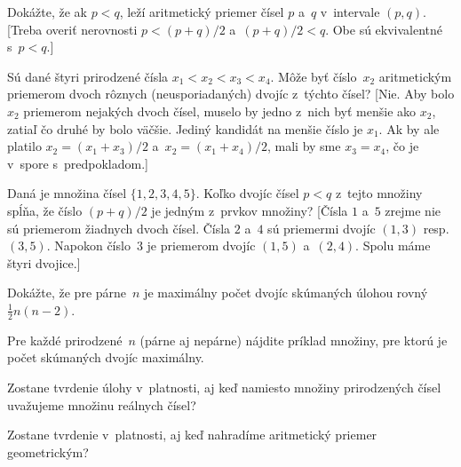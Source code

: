 {
Dokážte, že ak $p <q$, leží aritmetický priemer čísel
$p$ a~$q$ v~intervale $(p, q)$. [Treba overiť nerovnosti
$p <(p+q) / 2$ a~$(p+q) / 2 <q$. Obe sú ekvivalentné s~$p <q$.]

Sú dané štyri prirodzené čísla $x_1 <x_2 <x_3 <x_4$.
Môže byť číslo~$x_2$ aritmetickým priemerom dvoch rôznych
(neusporiadaných)
dvojíc z~týchto čísel? [Nie. Aby bolo $x_2$
priemerom nejakých dvoch čísel, muselo by jedno z~nich byť menšie ako
$x_2$, zatiaľ čo druhé by bolo väčšie. Jediný kandidát na menšie
číslo je $x_1$. Ak by ale platilo $x_2 = (x_1+x_3) / 2$
a~$x_2 = (x_1+x_4) / 2$, mali by sme $x_3 = x_4$, čo je v~spore s~predpokladom.]

Daná je množina čísel $\{1, 2, 3, 4, 5\}$. Koľko dvojíc
čísel $p <q$ z~tejto množiny spĺňa, že číslo $(p+q) / 2$ je jedným
z~prvkov množiny?
[Čísla $1$ a~$5$ zrejme nie sú priemerom
žiadnych dvoch čísel. Čísla $2$ a~$4$ sú priemermi dvojíc $(1, 3)$
resp. $(3, 5)$. Napokon číslo~$3$ je priemerom dvojíc $(1, 5)$
a~$(2, 4)$. Spolu máme štyri dvojice.]

\D
Dokážte, že pre párne~$n$ je maximálny počet
dvojíc skúmaných úlohou rovný $\frac{1}{2} n(n-2)$.

Pre každé prirodzené~$n$ (párne aj nepárne) nájdite
príklad množiny, pre ktorú je počet skúmaných dvojíc maximálny.

Zostane tvrdenie úlohy v~platnosti, aj keď namiesto množiny
prirodzených čísel uvažujeme množinu reálnych čísel?

Zostane tvrdenie v~platnosti, aj keď nahradíme
aritmetický priemer geometrickým?
}

